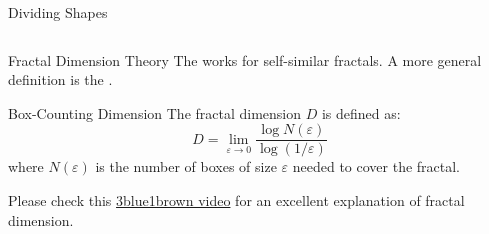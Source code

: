 \begin{frame}{Dividing Shapes}
\begin{columns}
\begin{column}{0.5\textwidth}
\begin{center}
      \end{center}
    \end{column}
  \end{columns}
\end{frame}

\begin{frame}{Fractal Dimension Theory}
  \small
  The  works for self-similar fractals. A more general definition is the .
  \begin{mathbox}{Box-Counting Dimension}
    The fractal dimension $D$ is defined as:
    $$D = \lim_{\varepsilon \to 0} \frac{\log N(\varepsilon)}{\log(1/\varepsilon)}$$
    where $N(\varepsilon)$ is the number of boxes of size $\varepsilon$ needed to cover the fractal.
  \end{mathbox}
  Please check this \href{https://www.youtube.com/watch?v=gB9n2gHsHN4}{\textcolor{AccentColor}{3blue1brown video}} for an excellent explanation of fractal dimension.
\end{frame}

